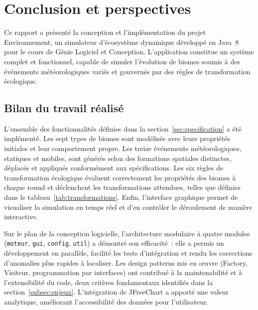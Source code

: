 \section{Conclusion et perspectives}
\label{sec:conclusion}

Ce rapport a présenté la conception et l'implémentation du projet Environnement,
un simulateur d'écosystème dynamique développé en Java~8 pour le cours
de Génie Logiciel et Conception. L'application constitue un système complet et
fonctionnel, capable de simuler l'évolution de biomes soumis à des événements
météorologiques variés et gouvernés par des règles de transformation écologique.

\subsection{Bilan du travail réalisé}
\label{subsec:bilan}

L'ensemble des fonctionnalités définies dans la section~\ref{sec:specification}
a été implémenté. Les sept types de biomes sont modélisés avec leurs propriétés
initiales et leur comportement propre. Les treize événements météorologiques,
statiques et mobiles, sont générés selon des formations spatiales distinctes,
déplacés et appliqués conformément aux spécifications. Les six règles de
transformation écologique évaluent correctement les propriétés des biomes à chaque
round et déclenchent les transformations attendues, telles que définies dans le
tableau~\ref{tab:transformations}. Enfin, l'interface graphique permet de
visualiser la simulation en temps réel et d'en contrôler le déroulement de manière
interactive.

Sur le plan de la conception logicielle, l'architecture modulaire à quatre modules
(\texttt{moteur}, \texttt{gui}, \texttt{config}, \texttt{util}) a démontré son
efficacité~: elle a permis un développement en parallèle, facilité les tests
d'intégration et rendu les corrections d'anomalies plus rapides à localiser. Les
design patterns mis en œuvre (Factory, Visiteur, programmation par
interfaces) ont contribué à la maintenabilité et à l'extensibilité du code, deux
critères fondamentaux identifiés dans la section~\ref{subsec:enjeux}. L'intégration
de JFreeChart a apporté une valeur analytique, améliorant l'accessibilité des
données pour l'utilisateur.

